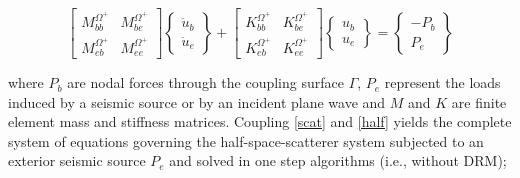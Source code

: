 \documentclass[12pt,letterpaper]{article}
\begin{document}
\begin{equation}
\left[ {\begin{array}{*{20}{c}}
{M_{bb}^{{\Omega ^ + }}}&{M_{be}^{{\Omega ^ + }}}\\
{M_{eb}^{{\Omega ^ + }}}&{M_{ee}^{{\Omega ^ + }}}
\end{array}} \right]\left\{ {\begin{array}{*{20}{c}}
{{{\ddot u}_b}}\\
{{{\ddot u}_e}}
\end{array}} \right\} + \left[ {\begin{array}{*{20}{c}}
{K_{bb}^{{\Omega ^ + }}}&{K_{be}^{{\Omega ^ + }}}\\
{K_{eb}^{{\Omega ^ + }}}&{K_{ee}^{{\Omega ^ + }}}
\end{array}} \right]\left\{ {\begin{array}{*{20}{c}}
{{u_b}}\\
{{u_e}}
\end{array}} \right\} = \left\{ {\begin{array}{*{20}{c}}
{ - {P_b}}\\
{{P_e}}
\end{array}} \right\}
\label{half}
\end{equation}

where $P_b$ are nodal forces through the coupling surface $\Gamma$, $P_e$ represent the loads induced by a seismic source or by an incident plane wave and $M$ and $K$ are finite element mass and stiffness matrices. Coupling \cref{scat} and \cref{half} yields the complete system of equations governing the half-space-scatterer system subjected to an exterior seismic source $P_e$ and solved in one step algorithms (i.e., without DRM);
\end{document}
